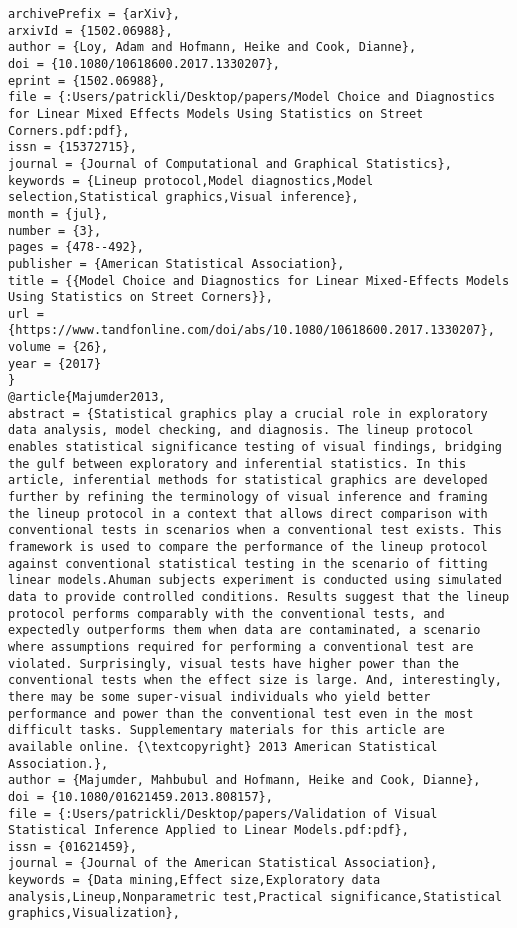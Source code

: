 \documentclass[
]{book}
\begin{document}
\begin{verbatim}
archivePrefix = {arXiv},
arxivId = {1502.06988},
author = {Loy, Adam and Hofmann, Heike and Cook, Dianne},
doi = {10.1080/10618600.2017.1330207},
eprint = {1502.06988},
file = {:Users/patrickli/Desktop/papers/Model Choice and Diagnostics for Linear Mixed Effects Models Using Statistics on Street Corners.pdf:pdf},
issn = {15372715},
journal = {Journal of Computational and Graphical Statistics},
keywords = {Lineup protocol,Model diagnostics,Model selection,Statistical graphics,Visual inference},
month = {jul},
number = {3},
pages = {478--492},
publisher = {American Statistical Association},
title = {{Model Choice and Diagnostics for Linear Mixed-Effects Models Using Statistics on Street Corners}},
url = {https://www.tandfonline.com/doi/abs/10.1080/10618600.2017.1330207},
volume = {26},
year = {2017}
}
@article{Majumder2013,
abstract = {Statistical graphics play a crucial role in exploratory data analysis, model checking, and diagnosis. The lineup protocol enables statistical significance testing of visual findings, bridging the gulf between exploratory and inferential statistics. In this article, inferential methods for statistical graphics are developed further by refining the terminology of visual inference and framing the lineup protocol in a context that allows direct comparison with conventional tests in scenarios when a conventional test exists. This framework is used to compare the performance of the lineup protocol against conventional statistical testing in the scenario of fitting linear models.Ahuman subjects experiment is conducted using simulated data to provide controlled conditions. Results suggest that the lineup protocol performs comparably with the conventional tests, and expectedly outperforms them when data are contaminated, a scenario where assumptions required for performing a conventional test are violated. Surprisingly, visual tests have higher power than the conventional tests when the effect size is large. And, interestingly, there may be some super-visual individuals who yield better performance and power than the conventional test even in the most difficult tasks. Supplementary materials for this article are available online. {\textcopyright} 2013 American Statistical Association.},
author = {Majumder, Mahbubul and Hofmann, Heike and Cook, Dianne},
doi = {10.1080/01621459.2013.808157},
file = {:Users/patrickli/Desktop/papers/Validation of Visual Statistical Inference Applied to Linear Models.pdf:pdf},
issn = {01621459},
journal = {Journal of the American Statistical Association},
keywords = {Data mining,Effect size,Exploratory data analysis,Lineup,Nonparametric test,Practical significance,Statistical graphics,Visualization},

\end{verbatim}
\end{document}
